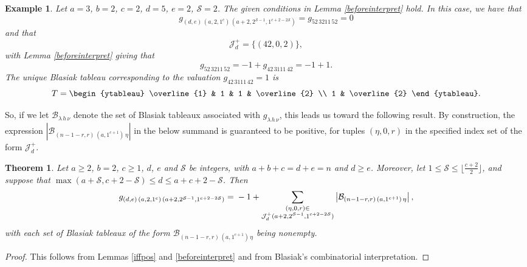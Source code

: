 \documentclass[12pt]{article}
\newtheorem{theorem}{Theorem}
\newtheorem{example}{Example}
\begin{document}
\begin{example}
 Let $a = 3$, $b = 2$, $c=2$, $d=5$, $e=2$, $\mathcal{S} = {2}$. The given conditions in Lemma \ref{beforeinterpret} hold. In this case, 
 we have that $$ g_{(d, e) \, (a, 2, 1^c) \, (a+2, 2^{\mathcal{S}-1}, 1^{c+2-2\mathcal{S}})} = g_{52 \, 3211 \, 52} = 0 $$ and that 
 $$ \mathcal{J}^{+}_{d} = \big\{ (42, 0, 2) \big\}, $$ with Lemma \ref{beforeinterpret} giving that $$ g_{52 \, 3211 \, 52} = -1 + g_{42 \, 
 3111 \, 42} = -1 + 1. $$ The unique Blasiak tableau corresponding to the valuation $g_{42 \, 3111 \, 42} = 1$ is 
\begin{equation*}
 T = \begin{ytableau} \overline{1} & 1 & 1 & \overline{2} \\ 1 & \overline{2} \end{ytableau}. 
\end{equation*}
 \end{example}

 So, if we let $\mathcal{B}_{\lambda \, h \, \nu}$ denote the set of Blasiak tableaux associated with $g_{\lambda \, h \, \nu}$, this leads us 
 toward the following result. By construction, 
 the expression $ \left| \mathcal{B}_{ (n - 1 - r,r) \, (a, 1^{c+1}) \, \eta } \right| $ in the below summand
 is guaranteed to be positive, for tuples $(\eta, 0, r)$ in the specified index
 set of the form $\mathcal{J}_{d}^{+}$. 

\begin{theorem}\label{mainresult}
 Let $a \geq 2$, $b = 2$, $c \geq 1$, $d$, $e$ and $\mathcal{S}$ be integers, with $a+b+c = d + e = n$ and $d \geq e$. Moreover, 
 let $1 \leq \mathcal{S} \leq \lfloor \frac{c+2}{2} \rfloor$, and suppose that $\max(a + \mathcal{S}, c + 2 - \mathcal{S}) \leq d \leq a + c 
 + 2 -\mathcal{S}$. Then $$ g_{(d, e) \, (a, 2, 1^c) \, (a+2, 2^{\mathcal{S}-1}, 1^{c+2-2\mathcal{S}})} = \\ 
 - 1 + \sum_{\substack{ (\eta, 0, r) \in \\ \mathcal{J}^{+}_{d}( a+2, 2^{\mathcal{S}-1}, 1^{c+2-2\mathcal{S}} ) } } 
 \left| \mathcal{B}_{ (n - 1 - r,r) \, (a, 1^{c+1}) \, \eta } \right|, $$
 with each set of Blasiak tableaux of the form $ \mathcal{B}_{ (n - 1 - r,r) \, (a, 1^{c+1}) \, \eta }$ being nonempty. 
\end{theorem}

\begin{proof}
 This follows from Lemmas \ref{iffpos}
 and \ref{beforeinterpret} and from Blasiak's combinatorial interpretation. 
\end{proof}
\end{document}
